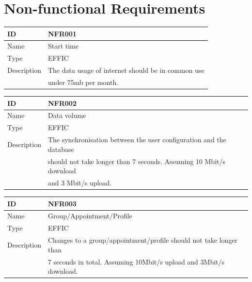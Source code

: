 \documentclass[12pt]{scrartcl}
\begin{document}

    \section{Non-functional Requirements}                       %
        \begin{tabular}{|l|l|}
            \hline
            ID & NFR001 \\ \hline
            Name & Start time\\ \hline
            Type & EFFIC\\ \hline
            Description & The data usage of internet should be in common use \\ 
            &under 75mb per month.\\ \hline
        \end{tabular}
        \vspace*{1 cm}
        \begin{flushleft}
            \begin{tabular}{|l|l|}
                \hline
                ID & NFR002 \\ \hline
                Name & Data volume\\ \hline
                Type & EFFIC\\ \hline
                Description & The synchronisation between the user configuration and the database \\
                &should not take longer than 7 seconds. Assuming 10 Mbit/s download \\ 
                &and 3 Mbit/s upload. \\ \hline
            \end{tabular}
        \end{flushleft}

        \vspace*{1 cm}
        \begin{flushleft}
            \begin{tabular}{|l|l|}
                \hline
                ID & NFR003 \\ \hline
                Name & Group/Appointment/Profile \\ \hline
                Type & EFFIC\\ \hline
                Description & Changes to a group/appointment/profile should not take longer than \\
                &7 seconds in total. Assuming 10Mbit/s upload and 3Mbit/s download.\\ \hline
            \end{tabular}
        \end{flushleft}
\end{document}
